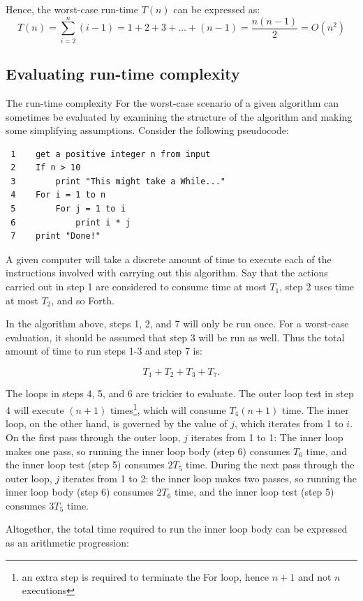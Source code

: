 \documentclass[12pt]{book} %
\begin{document}
Hence, the worst-case run-time $T(n)$ can be expressed as:
$$ T(n) = \sum_{i=2}^{n} (i - 1) = 1 + 2 + 3 + \dots + (n-1) = \frac{n(n-1)}{2} = O(n^2) $$




\subsection{Evaluating run-time complexity}

The run-time complexity For the worst-case scenario of a given algorithm can sometimes be evaluated by examining the structure of the algorithm and making some simplifying assumptions.  Consider the following pseudocode:

\begin{verbatim}
 1    get a positive integer n from input
 2    If n > 10
 3        print "This might take a While..."
 4    For i = 1 to n
 5        For j = 1 to i
 6            print i * j
 7    print "Done!"
\end{verbatim}

A given computer will take a discrete amount of time to execute each of the instructions involved with carrying out this algorithm.  Say that the actions carried out in step 1 are considered to consume time at most $T_1$, step 2 uses time at most $T_2$, and so Forth.

In the algorithm above, steps 1, 2, and 7 will only be run once.  For a worst-case evaluation, it should be assumed that step 3 will be run as well.  Thus the total amount of time to run steps 1-3 and step 7 is:

\[
T_1 + T_2 + T_3 + T_7.
\]

The loops in steps 4, 5, and 6 are trickier to evaluate.  The outer loop test in step 4 will execute $(n + 1)$ times\footnote{an extra step is required to terminate the For loop, hence $n + 1$ and not $n$ executions}, which will consume $T_4(n + 1)$ time.  The inner loop, on the other hand, is governed by the value of $j$, which iterates from 1 to $i$.  On the first pass through the outer loop, $j$ iterates from 1 to 1:  The inner loop makes one pass, so running the inner loop body (step 6) consumes $T_6$ time, and the inner loop test (step 5) consumes $2T_5$ time.  During the next pass through the outer loop, $j$ iterates from 1 to 2:  the inner loop makes two passes, so running the inner loop body (step 6) consumes $2T_6$ time, and the inner loop test (step 5) consumes $3T_5$ time.

Altogether, the total time required to run the inner loop body can be expressed as an arithmetic progression:
\end{document}
